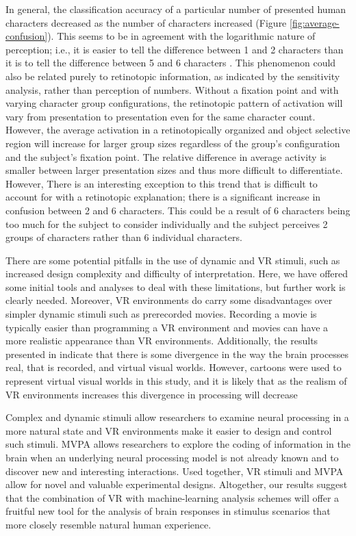 \documentclass[review,1p,authoryear]{elsarticle}
\begin{document}
In general, the classification accuracy of a particular number of presented human characters decreased as the number of characters increased (Figure \ref{fig:average-confusion}).
This seems to be in agreement with the logarithmic nature of perception; i.e., it is easier to tell the difference between 1 and 2 characters than it is to tell the difference between 5 and 6 characters \citep{Shepard1975,Dehaene2003}.
This phenomenon could also be related purely to retinotopic information, as indicated by the sensitivity analysis, rather than perception of numbers.
Without a fixation point and with varying character group configurations, the retinotopic pattern of activation will vary from presentation to presentation even for the same character count.
However, the average activation in a retinotopically organized and object selective region will increase for larger group sizes regardless of the group's configuration and the subject's fixation point.
The relative difference in average activity is smaller between larger presentation sizes and thus more difficult to differentiate.
However, There is an interesting exception to this trend that is difficult to account for with a retinotopic explanation; there is a significant increase in confusion between 2 and 6 characters.
This could be a result of 6 characters being too much for the subject to consider individually and the subject perceives 2 groups of characters rather than 6 individual characters.

There are some potential pitfalls in the use of dynamic and VR stimuli, such as increased design complexity and difficulty of interpretation. 
Here, we have offered some initial tools and analyses to deal with these limitations, but further work is clearly needed.
Moreover, VR environments do carry some disadvantages over simpler dynamic stimuli such as prerecorded movies. 
Recording a movie is typically easier than programming a VR environment and movies can have a more realistic appearance than VR environments.
Additionally, the results presented in \cite{Han2005} indicate that there is some divergence in the way the brain processes real, that is recorded, and virtual visual worlds. 
However, cartoons were used to represent virtual visual worlds in this study, and it is likely that as the realism of VR environments increases this divergence in processing will decrease

Complex and dynamic stimuli allow researchers to examine neural processing in a more natural state and VR environments make it easier to design and control such stimuli.
MVPA allows researchers to explore the coding of information in the brain when an underlying neural processing model is not already known and to discover new and interesting interactions.
Used together, VR stimuli and MVPA allow for novel and valuable experimental designs.
Altogether, our results suggest that the combination of VR with machine-learning analysis schemes will offer a fruitful new tool for the analysis of brain responses in stimulus scenarios that more closely resemble natural human experience.


\end{document}
